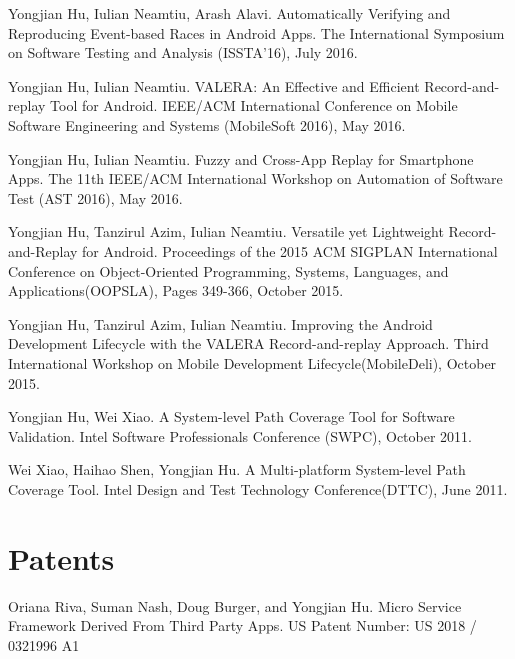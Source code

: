 \documentclass[margin,line]{res}
\begin{document}
\begin{resume}
Yongjian Hu, Iulian Neamtiu, Arash Alavi. Automatically Verifying and Reproducing Event-based Races in Android Apps.
The International Symposium on Software Testing and Analysis (ISSTA'16), July 2016.

Yongjian Hu, Iulian Neamtiu. VALERA: An Effective and Efficient Record-and-replay Tool for Android.
IEEE/ACM International Conference on Mobile Software Engineering and Systems (MobileSoft 2016), May 2016.

Yongjian Hu, Iulian Neamtiu. Fuzzy and Cross-App Replay for Smartphone Apps.
The 11th IEEE/ACM International Workshop on Automation of Software Test (AST 2016), May 2016.

Yongjian Hu, Tanzirul Azim, Iulian Neamtiu. Versatile yet Lightweight Record-and-Replay for Android.
Proceedings of the 2015 ACM SIGPLAN International Conference on Object-Oriented Programming, Systems, Languages, and Applications(OOPSLA),
Pages 349-366, October 2015.

Yongjian Hu, Tanzirul Azim, Iulian Neamtiu. Improving the Android Development Lifecycle with the VALERA Record-and-replay Approach.
Third International Workshop on Mobile Development Lifecycle(MobileDeli), October 2015.


Yongjian Hu, Wei Xiao. A System-level Path Coverage Tool for Software Validation.
Intel Software Professionals Conference (SWPC), October 2011.

Wei Xiao, Haihao Shen, Yongjian Hu. A Multi-platform System-level Path Coverage Tool.
Intel Design and Test Technology Conference(DTTC), June 2011.





\section{\sc Patents}
Oriana Riva, Suman Nash, Doug Burger, and Yongjian Hu. 
Micro Service Framework Derived From Third Party Apps.
US Patent Number: US 2018 / 0321996 A1




\end{resume}
\end{document}
